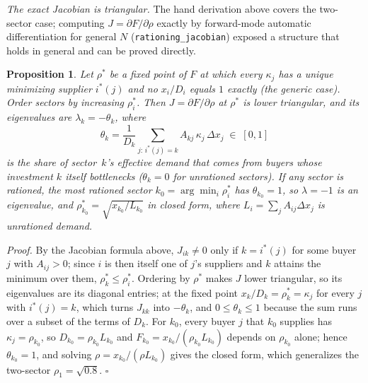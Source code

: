 \documentclass[11pt]{article}
\newtheorem{proposition}{Proposition}
\begin{document}
\emph{The exact Jacobian is triangular.} The hand derivation above
covers the two-sector case; computing $J=\partial F/\partial\rho$
exactly by forward-mode automatic differentiation for general $N$
(\texttt{rationing\_jacobian}) exposed a structure that holds in
general and can be proved directly.

\begin{proposition}\label{prop:triangular}
Let $\rho^*$ be a fixed point of $F$ at which every $\kappa_j$ has a
unique minimizing supplier $i^*(j)$ and no $x_i/D_i$ equals $1$ exactly
(the generic case). Order sectors by increasing $\rho^*_i$. Then
$J=\partial F/\partial\rho$ at $\rho^*$ is lower triangular, and its
eigenvalues are $\lambda_k=-\theta_k$, where
\begin{equation}
  \theta_k = \frac{1}{D_k}\sum_{j:\,i^*(j)=k} A_{kj}\,\kappa_j\,\Delta x_j
  \;\in\;[0,1]
\end{equation}
is the share of sector~$k$'s effective demand that comes from buyers
whose investment $k$ itself bottlenecks ($\theta_k=0$ for unrationed
sectors). If any sector is rationed, the most rationed sector
$k_0=\arg\min_i\rho^*_i$ has $\theta_{k_0}=1$, so $\lambda=-1$ is an
eigenvalue, and $\rho^*_{k_0}=\sqrt{x_{k_0}/L_{k_0}}$ in closed form,
where $L_i=\sum_jA_{ij}\Delta x_j$ is unrationed demand.
\end{proposition}

\emph{Proof.} By the Jacobian formula above, $J_{ik}\neq0$ only if
$k=i^*(j)$ for some buyer $j$ with $A_{ij}>0$; since $i$ is then itself
one of $j$'s suppliers and $k$ attains the minimum over them,
$\rho^*_k\le\rho^*_i$. Ordering by $\rho^*$ makes $J$ lower triangular,
so its eigenvalues are its diagonal entries; at the fixed point
$x_k/D_k=\rho^*_k=\kappa_j$ for every $j$ with $i^*(j)=k$, which turns
$J_{kk}$ into $-\theta_k$, and $0\le\theta_k\le1$ because the sum runs
over a subset of the terms of $D_k$. For $k_0$, every buyer $j$ that
$k_0$ supplies has $\kappa_j=\rho_{k_0}$, so $D_{k_0}=\rho_{k_0}L_{k_0}$
and $F_{k_0}=x_{k_0}/(\rho_{k_0}L_{k_0})$ depends on $\rho_{k_0}$ alone;
hence $\theta_{k_0}=1$, and solving $\rho=x_{k_0}/(\rho L_{k_0})$ gives
the closed form, which generalizes the two-sector $\rho_1=\sqrt{0.8}$.
$\square$
\end{document}
